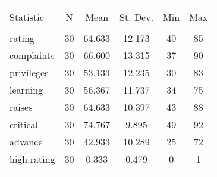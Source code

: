 
\begin{table}[!htbp] \centering 
  \caption{} 
  \label{} 
\begin{tabular}{@{\extracolsep{5pt}}lccccc} 
\\[-1.8ex]\hline 
\hline \\[-1.8ex] 
Statistic & \multicolumn{1}{c}{N} & \multicolumn{1}{c}{Mean} & \multicolumn{1}{c}{St. Dev.} & \multicolumn{1}{c}{Min} & \multicolumn{1}{c}{Max} \\ 
\hline \\[-1.8ex] 
rating & 30 & 64.633 & 12.173 & 40 & 85 \\ 
complaints & 30 & 66.600 & 13.315 & 37 & 90 \\ 
privileges & 30 & 53.133 & 12.235 & 30 & 83 \\ 
learning & 30 & 56.367 & 11.737 & 34 & 75 \\ 
raises & 30 & 64.633 & 10.397 & 43 & 88 \\ 
critical & 30 & 74.767 & 9.895 & 49 & 92 \\ 
advance & 30 & 42.933 & 10.289 & 25 & 72 \\ 
high.rating & 30 & 0.333 & 0.479 & 0 & 1 \\ 
\hline \\[-1.8ex] 
\end{tabular} 
\end{table} 

